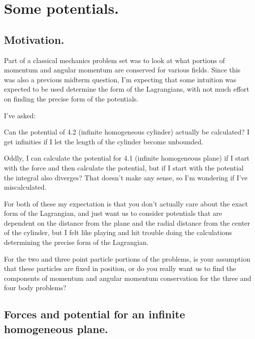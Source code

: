
%

\chapter{Some potentials.}
\label{chap:somePotentials}
{}
\date{Feb 19, 2012}

\beginArtWithToc

\section{Motivation.}

Part of a classical mechanics problem set was to look at what portions of momentum and angular momentum are conserved for various fields.  Since this was also a previous midterm question, I'm expecting that some intuition was expected to be used determine the form of the Lagrangians, with not much effort on finding the precise form of the potentials.

I've asked:

Can the potential of 4.2 (infinite homogeneous cylinder) actually be calculated?  I get infinities if I let the length of the cylinder become unbounded.

Oddly, I can calculate the potential for 4.1 (infinite homogeneous plane) if I start with the force and then calculate the potential, but if I start with the potential the integral also diverges?  That doesn't make any sense, so I'm wondering if I've miscalculated.

For both of these my expectation is that you don't actually care about the exact form of the Lagrangian, and just want us to consider potentials that are dependent on the distance from the plane and the radial distance from the center of the cylinder, but I felt like playing and hit trouble doing the calculations determining the precise form of the Lagrangian.

For the two and three point particle portions of the problems, is your assumption that these particles are fixed in position, or do you really want us to find the components of momentum and angular momentum conservation for the three and four body problems?

\section{Forces and potential for an infinite homogeneous plane.}

